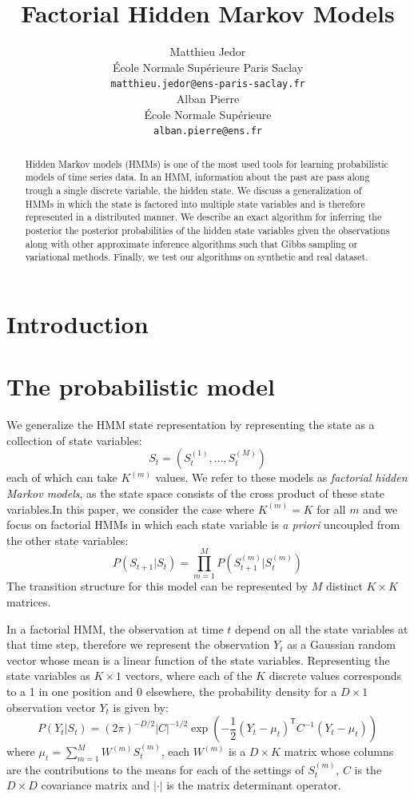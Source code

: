 \documentclass{article}
\title{Factorial Hidden Markov Models}
\author{
  Matthieu Jedor \\
  École Normale Supérieure Paris Saclay \\
  \texttt{matthieu.jedor@ens-paris-saclay.fr} \\
   \And
   Alban Pierre \\
   École Normale Supérieure \\
   \texttt{alban.pierre@ens.fr} \\
}
\begin{document}

\maketitle

\begin{abstract}
  Hidden Markov models (HMMs) is one of the most used tools for learning probabilistic models of time series data. In an HMM, information about the past are pass along trough a single discrete variable, the hidden state. We discuss a generalization of HMMs in which the state is factored into multiple state variables and is therefore represented in a distributed manner. We describe an exact algorithm for inferring the posterior the posterior probabilities of the hidden state variables given the observations along with other approximate inference algorithms such that Gibbs sampling or variational methods. Finally, we test our algorithms on synthetic and real dataset.
\end{abstract}

\section{Introduction}

\section{The probabilistic model}
We generalize the HMM state representation by representing the state as a collection of state variables:
\[ S_t = (S_t^{(1)},\dots,S_t^{(M)}) \]
each of which can take $K^{(m)}$ values. We refer to these models as \emph{factorial hidden Markov models}, as the state space consists of the cross product of these state variables.In this paper, we consider the case where $K^{(m)} = K$ for all $m$ and we focus on factorial HMMs in which each state variable is \emph{a priori} uncoupled from the other state variables:
\begin{equation} 
P(S_{t+1}|S_t) = \prod_{m=1}^M P(S_{t+1}^{(m)}|S_t^{(m)}) 
\end{equation}
The transition structure for this model can be represented by $M$ distinct $K \times K$ matrices.

In a factorial HMM, the observation at time $t$ depend on all the state variables at that time step, therefore we represent the observation $Y_t$ as a Gaussian random vector whose mean is a linear function of the state variables. Representing the state variables as $K \times 1$ vectors, where each of the $K$ discrete values corresponds to a 1 in one position and 0 elsewhere, the probability density for a $D \times 1$ observation vector $Y_t$ is given by:
\begin{equation}
P(Y_t|S_t) = (2 \pi)^{-D/2} \left| C \right|^{-1/2} \exp \left( -\frac{1}{2} (Y_t - \mu_t)^\mathsf{T} C^{-1} (Y_t - \mu_t) \right)
\end{equation}  
where $\mu_t = \sum_{m=1}^M W^{(m)} S_t^{(m)}$, each $W^{(m)}$ is a $D \times K$ matrix whose columns are the contributions to the means for each of the settings of $S_t^{(m)}$, $C$ is the $D \times D$ covariance matrix and $\left| \cdot \right|$ is the matrix determinant operator.
\end{document}
